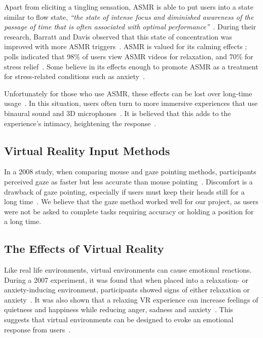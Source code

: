 \documentclass{sigchi}
\newcommand{\inlinequote}[1]{\textit{``#1''}}
\begin{document}
Apart from eliciting a tingling sensation, ASMR is able to put users into a state similar to flow state, \inlinequote{the state of intense focus and diminished awareness of the passage of time that is often associated with optimal performance}~\cite{barratt2015autonomous}. During their research, Barratt and Davis observed that this state of concentration was improved with more ASMR triggers~\cite{barratt2015autonomous}. ASMR is valued for its calming effects \cite{barratt2015autonomous}; polls indicated that 98\% of users view ASMR videos for relaxation, and 70\% for stress relief~\cite{barratt2015autonomous}. Some believe in its effects enough to promote ASMR as a treatment for stress-related conditions such as anxiety~\cite{andersen2015now,begman2015}.

Unfortunately for those who use ASMR, these effects can be lost over long-time usage~\cite{andersen2015now}. In this situation, users often turn to more immersive experiences that use binaural sound and 3D microphones~\cite{andersen2015now}. It is believed that this adds to the experience's intimacy, heightening the response~\cite{andersen2015now}. 

\subsection{Virtual Reality Input Methods}
In a 2008 study, when comparing mouse and gaze pointing methods, participants perceived gaze as faster but less accurate than mouse pointing~\cite{mateo2008gaze}. Discomfort is a drawback of gaze pointing, especially if users must keep their heads still for a long time~\cite{mateo2008gaze}. We believe that the gaze method worked well for our project, as users were not be asked to complete tasks requiring accuracy or holding a position for a long time.

\subsection{The Effects of Virtual Reality}
Like real life environments, virtual environments can cause emotional reactions. During a 2007 experiment, it was found that when placed into a relaxation- or anxiety-inducing environment, participants showed signs of either relaxation or anxiety~\cite{riva2007affective}. It was also shown that a relaxing VR experience can increase feelings of quietness and happiness while reducing anger, sadness and anxiety~\cite{riva2007affective}. This suggests that virtual environments can be designed to evoke an emotional response from users~\cite{riva2007affective,wiederhold2006evaluation}. 
\end{document}
